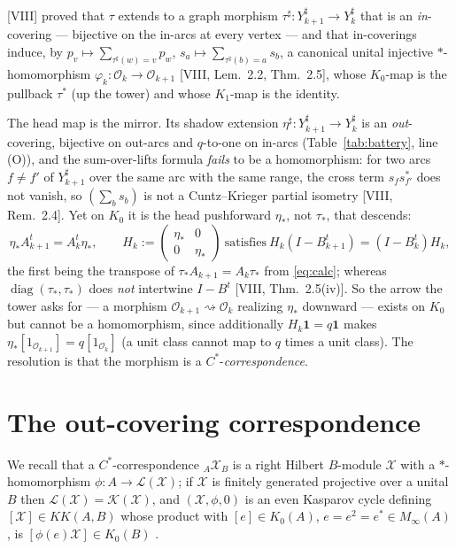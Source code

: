 \documentclass[11pt]{amsart}
\numberwithin{equation}{section}
\theoremstyle{definition}
\theoremstyle{remark}
\newcommand{\cO}{\mathcal{O}}
\newcommand{\cX}{\mathcal{X}}
\newcommand{\cK}{\mathcal{K}}
\newcommand{\cL}{\mathcal{L}}
\newcommand{\KK}{\mathit{KK}}
\newcommand{\ta}{\tau_*}
\newcommand{\taup}{\tau^*}
\newcommand{\et}{\eta_*}
\newcommand{\Ysh}[1]{Y_{#1}^{\sharp}}
\begin{document}
[VIII] proved that $\tau$ extends to a graph morphism $\tau^{\sharp}\colon\Ysh{k+1}\to
\Ysh{k}$ that is an \emph{in}-covering --- bijective on the in-arcs at every vertex --- and
that in-coverings induce, by $p_v\mapsto\sum_{\tau^\sharp(w)=v}p_w$,
$s_a\mapsto\sum_{\tau^\sharp(b)=a}s_b$, a canonical unital injective $*$-homomorphism
$\varphi_k\colon\cO_k\to\cO_{k+1}$ [VIII, Lem.~2.2, Thm.~2.5], whose $K_0$-map is the
pullback $\taup$ (up the tower) and whose $K_1$-map is the identity.

The head map is the mirror. Its shadow extension $\eta^{\sharp}\colon\Ysh{k+1}\to\Ysh{k}$
is an \emph{out}-covering, bijective on out-arcs and $q$-to-one on in-arcs
(Table~\ref{tab:battery}, line (O)), and the sum-over-lifts formula \emph{fails} to be a
homomorphism: for two arcs $f\ne f'$ of $\Ysh{k+1}$ over the same arc with the same range,
the cross term $s_fs_{f'}^{*}$ does not vanish, so $(\sum_bs_b)$ is not a Cuntz--Krieger
partial isometry [VIII, Rem.~2.4]. Yet on $K_0$ it is the head pushforward $\et$, not
$\ta$, that descends:
\begin{equation}\label{eq:etdesc}
\et A_{k+1}^{t}=A_k^{t}\et,\qquad
H_k:=\begin{pmatrix}\et&0\\0&\et\end{pmatrix}\ \text{satisfies}\
H_k(I-B_{k+1}^{t})=(I-B_k^{t})H_k ,
\end{equation}
the first being the transpose of $\ta A_{k+1}=A_k\ta$ from \eqref{eq:calc};
whereas $\operatorname{diag}(\ta,\ta)$ does \emph{not} intertwine $I-B^{t}$
[VIII, Thm.~2.5(iv)]. So the arrow the tower asks for --- a morphism
$\cO_{k+1}\rightsquigarrow\cO_k$ realizing $\et$ downward --- exists on $K_0$ but cannot be
a homomorphism, since additionally $H_k\mathbf1=q\mathbf1$ makes $\et[1_{\cO_{k+1}}]=q[1_{\cO_k}]$
(a unit class cannot map to $q$ times a unit class). The resolution is that the morphism is
a $C^*$-\emph{correspondence}.

\section{The out-covering correspondence}\label{sec:corr}

We recall that a $C^*$-correspondence ${}_A\cX_B$ is a right Hilbert $B$-module $\cX$ with a
$*$-homomorphism $\phi\colon A\to\cL(\cX)$; if $\cX$ is finitely generated projective over a
unital $B$ then $\cL(\cX)=\cK(\cX)$, and $(\cX,\phi,0)$ is an even Kasparov cycle defining
$[\cX]\in\KK(A,B)$ whose product with $[e]\in K_0(A)$, $e=e^2=e^*\in M_\infty(A)$, is
$[\phi(e)\cX]\in K_0(B)$ \cite{Kas,Bla}.
\end{document}
